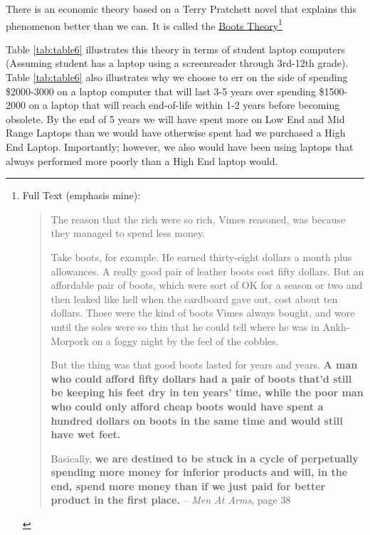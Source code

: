 There is an economic theory based on a Terry Pratchett novel that explains this phenomenon better than we can. It is called the \href{http://en.wikipedia.org/wiki/Boots_theory}{Boots Theory}\footnote{\raggedright Full Text (emphasis mine):
	\begin{leftbar}
		\begin{quote}The reason that the rich were so rich, Vimes reasoned, was because they managed to spend less money.

			Take boots, for example. He earned thirty-eight dollars a month plus allowances. A really good pair of leather boots cost fifty dollars. But an affordable pair of boots, which were sort of OK for a season or two and then leaked like hell when the cardboard gave out, cost about ten dollars. Those were the kind of boots Vimes always bought, and wore until the soles were so thin that he could tell where he was in Ankh-Morpork on a foggy night by the feel of the cobbles.

			But the thing was that good boots lasted for years and years. \textbf{A man who could afford fifty dollars had a pair of boots that’d still be keeping his feet dry in ten years’ time, while the poor man who could only afford cheap boots would have spent a hundred dollars on boots in the same time and would still have wet feet.}

			Basically, \textbf{we are destined to be stuck in a cycle of perpetually spending more money for inferior products and will, in the end, spend more money than if we just paid for better product in the first place.} \break \qquad-- \textit{Men At Arms}, page 38
		\end{quote}
	\end{leftbar} 
 }

\hfill \break Table \ref{tab:table6} illustrates this theory in terms of student laptop computers (Assuming student has a laptop using a screenreader through 3rd-12th grade). Table \ref{tab:table6} also illustrates why we choose to err on the side of spending \$2000-3000 on a laptop computer that will last 3-5 years over spending \$1500-2000 on a laptop that will reach end-of-life within 1-2 years before becoming obsolete. By the end of 5 years we will have spent more on Low End and Mid Range Laptops than we would have otherwise spent had we purchased a High End Laptop. Importantly; however, we also would have been using laptops that always performed more poorly than a High End laptop would.

